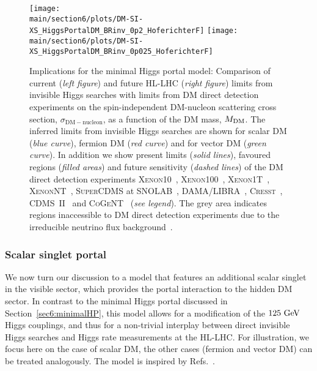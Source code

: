 \documentclass[../report.tex]{subfiles}
\providecommand{\main}{..}
\begin{document}
\begin{figure}
\centering
\texttt{[image: \\main/section6/plots/DM-SI-XS\_HiggsPortalDM\_BRinv\_0p2\_HoferichterF]}
\hfill
\texttt{[image: \\main/section6/plots/DM-SI-XS\_HiggsPortalDM\_BRinv\_0p025\_HoferichterF]}
\caption{\label{fig:mini} Implications for the minimal Higgs portal model: Comparison of current (\emph{left figure}) and future HL-LHC (\emph{right figure}) limits from invisible Higgs searches  with limits from DM direct detection experiments on the spin-independent DM-nucleon scattering cross section, $\sigma_{\mathrm{DM}-\mathrm{nucleon}}$, as a function of the DM mass, $M_\mathrm{DM}$. The inferred limits from invisible Higgs searches are shown for scalar DM (\emph{blue curve}), fermion DM (\emph{red  curve}) and for vector DM (\emph{green  curve}). In addition we show present limits (\emph{solid lines}), favoured regions (\emph{filled areas}) and future sensitivity (\emph{dashed lines}) of the DM direct detection experiments \textsc{Xenon10}~\cite{Angle:2011th}, \textsc{Xenon100}~\cite{Aprile:2012nq}, \textsc{Xenon1T}~\cite{Aprile:2018dbl}, \textsc{XenonNT}~\cite{Aprile:2015uzo}, \textsc{SuperCDMS} at SNOLAB~\cite{Agnese:2016cpb}, \textsc{DAMA/LIBRA}~\cite{Savage:2008er}, \textsc{Cresst}~\cite{Angloher:2011uu}, \textsc{CDMS~II}~\cite{Agnese:2013rvf} and \textsc{CoGeNT}~\cite{Aalseth:2012if} (\emph{see legend}). The grey area indicates regions inaccessible to DM direct detection experiments due to the irreducible neutrino flux background~\cite{Billard:2013qya}.}
\label{fig:minimalHP}
\end{figure}



\subsubsection{Scalar singlet portal}
\label{sec6:singletHP}
We now turn our discussion to a model that features an additional scalar singlet in the visible sector, which provides the portal interaction to the hidden DM sector. In contrast to the minimal Higgs portal discussed in Section~\ref{sec6:minimalHP}, this model allows for a modification of the $125~\text{GeV}$ Higgs couplings, and thus for a non-trivial interplay between direct invisible Higgs searches and Higgs rate measurements at the HL-LHC. For illustration, we focus here on the case of scalar DM, the other cases (fermion and vector DM) can be treated analogously. The model is inspired by Refs.~\cite{Englert:2011yb,Robens:2015gla}.
\end{document}
